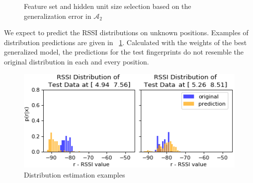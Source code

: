 \documentclass{article}
\begin{document}
	\begin{figure}[h]
		\centering
		\caption{Feature set and hidden unit size selection based on the generalization error in $\mathcal{A}_2$}
	\end{figure}
	
	We expect to predict the RSSI distributions on unknown positions. Examples of distribution predictions are given in \figurename~\ref{fig:predictions}. Calculated with the weights of the best generalized model, the predictions for the test fingerprints do not resemble the original distribution in each and every position. 
	\begin{figure}[h]
		\centering
		\includegraphics[width=0.8\linewidth]{Pred-Test-3-mini-3}
		
		\caption{Distribution estimation examples}
		\label{fig:predictions}
	\end{figure} 
	
\end{document}
